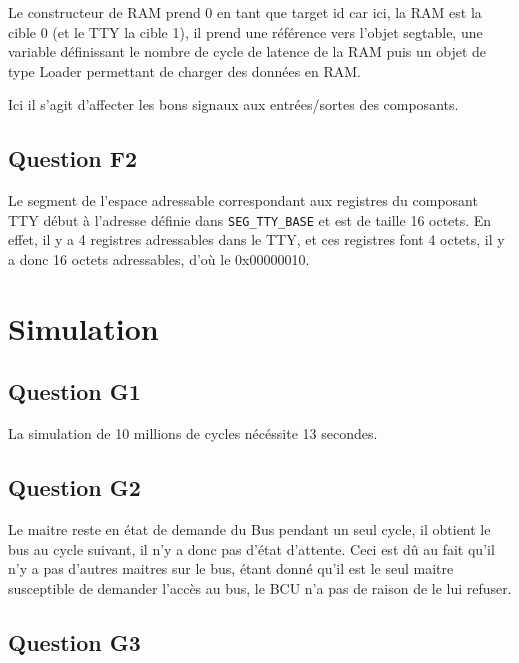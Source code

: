 \documentclass{article}
\begin{document}
Le constructeur de RAM prend 0 en tant que target id car ici, la RAM
est la cible 0 (et le TTY la cible 1), il prend une référence vers l'objet
segtable, une variable définissant le nombre de cycle de latence de la RAM
puis un objet de type Loader permettant de charger des données en RAM.
\newpage



Ici il s'agit d'affecter les bons signaux aux entrées/sortes des composants.



\subsection{Question F2}

Le segment de l'espace adressable correspondant aux registres du composant TTY
début à l'adresse définie dans \texttt{SEG\_TTY\_BASE} et est de taille
16 octets.
En effet, il y a 4 registres adressables dans le TTY, et ces registres font
4 octets, il y a donc 16 octets adressables, d'où le 0x00000010.



\section{Simulation}

\subsection{Question G1}
La simulation de 10 millions de cycles nécéssite 13 secondes.

\subsection{Question G2}

Le maitre reste en état de demande du Bus pendant un seul cycle,
il obtient le bus au cycle suivant, il n'y a donc pas d'état d'attente.
Ceci est dû au fait qu'il n'y a pas d'autres maitres sur le bus,
étant donné qu'il est le seul maitre susceptible de demander l'accès au bus,
le BCU n'a pas de raison de le lui refuser.

\subsection{Question G3}
\end{document}
